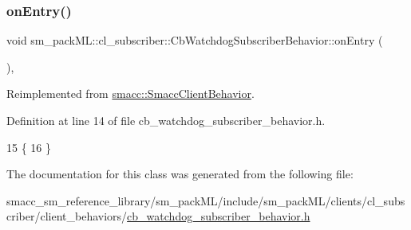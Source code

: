 \subsubsection{\texorpdfstring{on\+Entry()}{onEntry()}}
{\footnotesize\ttfamily void sm\+\_\+pack\+M\+L\+::cl\+\_\+subscriber\+::\+Cb\+Watchdog\+Subscriber\+Behavior\+::on\+Entry (\begin{DoxyParamCaption}{ }\end{DoxyParamCaption})\hspace{0.3cm}{\ttfamily [inline]}, {\ttfamily [virtual]}}



Reimplemented from \hyperlink{classsmacc_1_1SmaccClientBehavior_a7962382f93987c720ad432fef55b123f}{smacc\+::\+Smacc\+Client\+Behavior}.



Definition at line 14 of file cb\+\_\+watchdog\+\_\+subscriber\+\_\+behavior.\+h.


\begin{DoxyCode}
15     \{
16     \}
\end{DoxyCode}


The documentation for this class was generated from the following file\+:\begin{DoxyCompactItemize}
\item 
smacc\+\_\+sm\+\_\+reference\+\_\+library/sm\+\_\+pack\+M\+L/include/sm\+\_\+pack\+M\+L/clients/cl\+\_\+subscriber/client\+\_\+behaviors/\hyperlink{sm__packML_2include_2sm__packML_2clients_2cl__subscriber_2client__behaviors_2cb__watchdog__subscriber__behavior_8h}{cb\+\_\+watchdog\+\_\+subscriber\+\_\+behavior.\+h}\end{DoxyCompactItemize}
